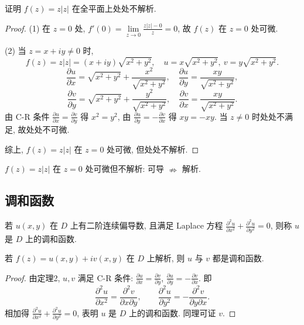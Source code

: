\documentclass[theorem=false,mathfont=none,openany,sub3section]{easybook}
\begin{document}
\begin{example}
  证明 $f(z)=z|z|$ 在全平面上处处不解析.\par
  \begin{proof}
    (1) 在 $z=0$ 处, $f'(0)=\lim\limits_{z\to0}\frac{z|z|-0}{z}=0$, 故 $f(z)$ 在 $z=0$ 处可微.\par
    (2) 当 $z=x+iy\neq0$ 时,
    \[
    f(z)=z|z|=(x+iy)\sqrt{x^{2}+y^{2}},\quad
    u=x\sqrt{x^{2}+y^{2}},\ v=y\sqrt{x^{2}+y^{2}}.
    \]
    \[
    \frac{\partial u}{\partial x}=\sqrt{x^{2}+y^{2}}+\frac{x^{2}}{\sqrt{x^{2}+y^{2}}},\quad
    \frac{\partial u}{\partial y}=\frac{xy}{\sqrt{x^{2}+y^{2}}},
    \]
    \[
    \frac{\partial v}{\partial y}=\sqrt{x^{2}+y^{2}}+\frac{y^{2}}{\sqrt{x^{2}+y^{2}}},\quad
    \frac{\partial v}{\partial x}=\frac{xy}{\sqrt{x^{2}+y^{2}}}.
    \]
    由 C-R 条件 $\frac{\partial u}{\partial x}=\frac{\partial v}{\partial y}$ 得 $x^{2}=y^{2}$, 由 $\frac{\partial u}{\partial y}=-\frac{\partial v}{\partial x}$ 得 $xy=-xy$. 当 $z\neq0$ 时处处不满足, 故处处不可微.\par
    综上, $f(z)=z|z|$ 在 $z=0$ 处可微, 但处处不解析.
  \end{proof}
\end{example}

\begin{remark}
  $f(z)=z|z|$ 在 $z=0$ 处可微但不解析: 可导 $\nRightarrow$ 解析.
\end{remark}

\subsection{调和函数}

\begin{definition}
  若 $u(x,y)$ 在 $D$ 上有二阶连续偏导数, 且满足 Laplace 方程 $\frac{\partial^{2}u}{\partial x^{2}}+\frac{\partial^{2}u}{\partial y^{2}}=0$, 则称 $u$ 是 $D$ 上的调和函数.
\end{definition}

\begin{corollary}
  若 $f(z)=u(x,y)+iv(x,y)$ 在 $D$ 上解析, 则 $u$ 与 $v$ 都是调和函数.
\end{corollary}

\begin{proof}
  由定理2, $u,v$ 满足 C-R 条件: $\frac{\partial u}{\partial x}=\frac{\partial v}{\partial y}$, $\frac{\partial u}{\partial y}=-\frac{\partial v}{\partial x}$. 即
  \[
  \frac{\partial^{2}u}{\partial x^{2}}=\frac{\partial^{2}v}{\partial x\partial y},\qquad
  \frac{\partial^{2}u}{\partial y^{2}}=-\frac{\partial^{2}v}{\partial y\partial x}.
  \]
  相加得 $\frac{\partial^{2}u}{\partial x^{2}}+\frac{\partial^{2}u}{\partial y^{2}}=0$, 表明 $u$ 是 $D$ 上的调和函数. 同理可证 $v$.
\end{proof}
\end{document}

